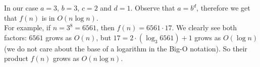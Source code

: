 \documentclass[jou]{apa6}
\begin{document}
In our case $a = 3$, $b = 3$, $c=2$ and $d = 1$. 
Observe that $a = b^d$, therefore we get that $f(n)$ is in 
$O(n \log n)$.\\

For example, if $n = 3^8 = 6561$, then $f(n) = 6561 \cdot 17$. 
We clearly see both factors: $6561$ grows as $O(n)$, but
$17 = 2 \cdot \left( \log_3 6561 \right) +1$ grows as $O(\log n)$ (we do not care about the
base of a logarithm in the Big-O notation). So their product 
$f(n)$ grows as $O(n \log n)$.
\end{document}
